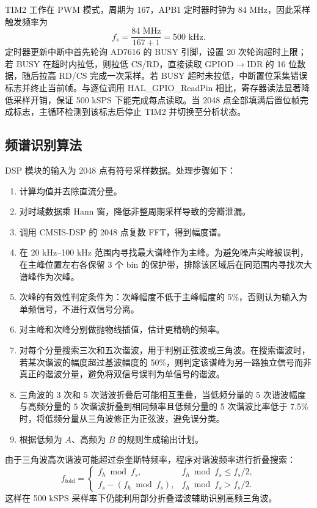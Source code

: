 \documentclass[UTF8,a4paper,zihao=-4]{ctexart}
\begin{document}
TIM2 工作在 PWM 模式，周期为 167，APB1 定时器时钟为 84 MHz，因此采样触发频率为
\begin{equation}
  f_s=\frac{84\text{ MHz}}{167+1}=500\text{ kHz}.
\end{equation}
定时器更新中断中首先轮询 AD7616 的 BUSY 引脚，设置 20 次轮询超时上限；若 BUSY 在超时内拉低，则拉低 CS/RD，直接读取 GPIOD$\to$IDR 的 16 位数据，随后拉高 RD/CS 完成一次采样。若 BUSY 超时未拉低，中断置位采集错误标志并终止当前帧。与逐位调用 HAL\_GPIO\_ReadPin 相比，寄存器读法显著降低采样开销，保证 500 kSPS 下能完成每点读取。当 2048 点全部填满后置位帧完成标志，主循环检测到该标志后停止 TIM2 并切换至分析状态。

\subsection{频谱识别算法}

DSP 模块的输入为 2048 点有符号采样数据。处理步骤如下：
\begin{enumerate}
  \item 计算均值并去除直流分量。
  \item 对时域数据乘 Hann 窗，降低非整周期采样导致的旁瓣泄漏。
  \item 调用 CMSIS-DSP 的 2048 点复数 FFT，得到幅度谱。
  \item 在 20 kHz--100 kHz 范围内寻找最大谱峰作为主峰。为避免噪声尖峰被误判，在主峰位置左右各保留 3 个 bin 的保护带，排除该区域后在同范围内寻找次大谱峰作为次峰。
  \item 次峰的有效性判定条件为：次峰幅度不低于主峰幅度的 5\%，否则认为输入为单频信号，不进行双信号分离。
  \item 对主峰和次峰分别做抛物线插值，估计更精确的频率。
  \item 对每个分量搜索三次和五次谐波，用于判别正弦波或三角波。在搜索谐波时，若某次谐波的幅度超过基波幅度的 50\%，则判定该谱峰为另一路独立信号而非真正的谐波分量，避免将双信号误判为单信号的谐波。
  \item 三角波的 3 次和 5 次谐波折叠后可能相互重叠，当低频分量的 5 次谐波幅度与高频分量的 5 次谐波折叠到相同频率且低频分量的 5 次谐波比率低于 7.5\% 时，将低频分量从三角波修正为正弦波，避免误分类。
  \item 根据低频为 $A$、高频为 $B$ 的规则生成输出计划。
\end{enumerate}

由于三角波高次谐波可能超过奈奎斯特频率，程序对谐波频率进行折叠搜索：
\begin{equation}
  f_{\text{fold}} =
  \begin{cases}
    f_h \bmod f_s, & f_h \bmod f_s \leq f_s/2,\\
    f_s-(f_h \bmod f_s), & f_h \bmod f_s > f_s/2.
  \end{cases}
\end{equation}
这样在 500 kSPS 采样率下仍能利用部分折叠谐波辅助识别高频三角波。
\end{document}

